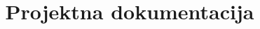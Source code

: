 \documentclass{ppjdoc}
\begin{document}
\title{Projektna dokumentacija}

\maketitle


\tableofcontents









\pagebreak


\end{document}
